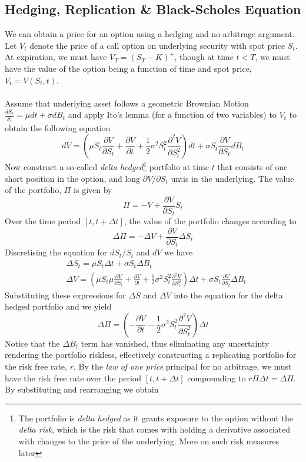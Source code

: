 \documentclass{article}
\begin{document}
\subsection{Hedging, Replication \& Black-Scholes Equation}
We can obtain a price for an option using a hedging and no-arbitrage argument. Let $V_t$ denote the price of a call option on underlying security with spot price $S_t$. At expiration, we must have $V_T = (S_T - K)^+$, though at time $t<T$, we must have the value of the option being a function of time and spot price, $V_t = V(S_t, t)$. \\
\\
Assume that underlying asset follows a geometric Brownian Motion $\frac{dS_t}{S_t} = \mu dt + \sigma dB_t$ and apply Ito's lemma (for a function of two variables) to $V_t$ to obtain the following equation
$$dV = \left(\mu S_t\frac{\partial V}{\partial S_t} + \frac{\partial V}{\partial t} + \frac{1}{2}\sigma^2 S_t^2\frac{\partial^2 V}{\partial S_t^2} \right)dt + \sigma S_t \frac{\partial V}{\partial S_t}dB_t$$
Now construct a so-called \textit{delta hedged}\footnote{The portfolio is \textit{delta hedged} as it grants exposure to the option without the \textit{delta risk}, which is the risk that comes with holding a derivative associated with changes to the price of the underlying. More on such risk measures later} portfolio at time $t$ that consists of one short position in the option, and long $\partial V / \partial S_t$ untis in the underlying. The value of the portfolio, $\Pi$ is given by
$$\Pi = -V + \frac{\partial V}{\partial S_t}S_t$$
Over the time period $[t, t+\Delta t]$, the value of the portfolio changes according to
$$\Delta\Pi = -\Delta V + \frac{\partial V}{\partial S_t}\Delta S_t$$
Discretising the equation for $dS_t/S_t$ and $dV$ we have 
\begin{align*}
    & \Delta S_t = \mu S_t\Delta t + \sigma S_t \Delta B_t \\
    & \Delta V = \left(\mu S_t\mu\frac{\partial V}{\partial S_t} + \frac{\partial V}{\partial t} + \frac{1}{2}\sigma^2 S_t^2\frac{\partial^2 V}{\partial S_t^2} \right)\Delta t + \sigma S_t \frac{\partial V}{\partial S_t}\Delta B_t
\end{align*}
Substituting these expressions for $\Delta S$ and $\Delta V$ into the equation for the delta hedged portfolio and we yield 
$$\Delta \Pi = \left( -\frac{\partial V}{\partial t}-\frac{1}{2}\sigma^2 S_t^2\frac{\partial^2 V}{\partial S_t^2}\right)\Delta t$$
Notice that the $\Delta B_t$ term has vanished, thus eliminating any uncertainty rendering the portfolio riskless, effectively constructing a replicating portfolio for the risk free rate, $r$. By the \textit{law of one price} principal for no arbitrage, we must have the risk free rate over the period $[t, t+\Delta t]$ compounding to $r\Pi\Delta t = \Delta \Pi$. By substituting and rearranging we obtain
\end{document}
